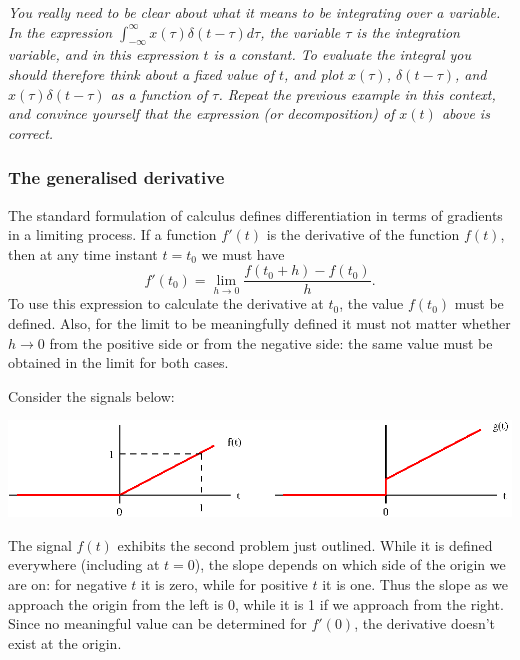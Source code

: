 \documentclass[10pt]{beamer}
\begin{document}
{\em You really need to be clear about what it means to be integrating over a variable.  In the expression $\int_{-\infty}^{\infty} x(\tau) \delta(t - \tau) d\tau$, the variable $\tau$ is the integration variable, and in this expression $t$ is a constant.  To evaluate the integral you should therefore think about a fixed value of $t$, and plot $x(\tau)$, $\delta(t - \tau)$, and $x(\tau) \delta(t - \tau)$ as a function of $\tau$.  Repeat the previous example in this context, and convince yourself that the expression (or decomposition) of $x(t)$ above is correct.}

\subsubsection{The generalised derivative}

The standard formulation of calculus defines differentiation in terms of gradients in a limiting process.  If a function $f'(t)$ is the derivative of the function $f(t)$, then at any time instant $t=t_0$ we must have
\begin{equation*}
  f'(t_0) = \lim_{h \to 0} \frac{f(t_0+h) - f(t_0)}{h}.
\end{equation*}
To use this expression to calculate the derivative at $t_0$, the value $f(t_0)$ must be defined.  Also, for the limit to be meaningfully defined it must not matter whether $h \to 0$ from the positive side or from the negative side:  the same value must be obtained in the limit for both cases.  

Consider the signals below:
\begin{center}
  \includegraphics{genderivex1}
\end{center}
The signal $f(t)$ exhibits the second problem just outlined.  While it is defined everywhere (including at $t=0$), the slope depends on which side of the origin we are on:  for negative $t$ it is zero, while for positive $t$ it is one.  Thus the slope as we approach the origin from the left is 0, while it is 1 if we approach from the right.  Since no meaningful value can be determined for $f'(0)$, the derivative doesn't exist at the origin.
\end{document}

